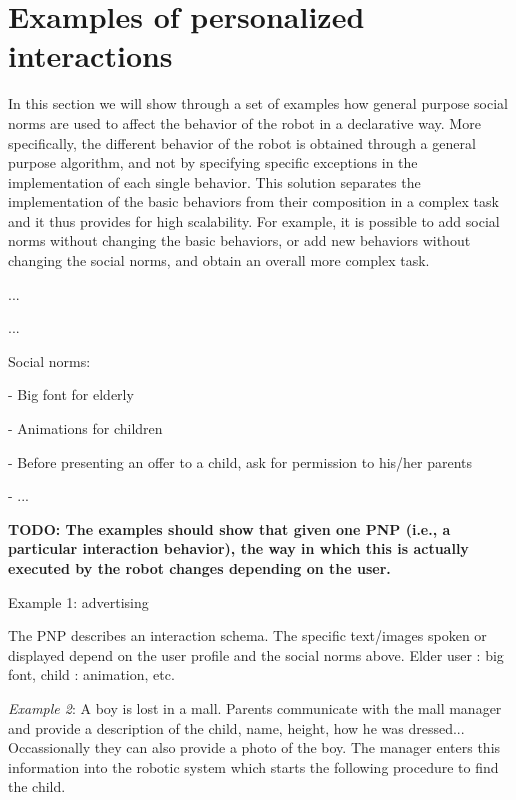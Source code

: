 \section{Examples of personalized interactions}


In this section we will show through a set of examples how general purpose social norms are used to affect the behavior of the robot in a declarative way. More specifically, the different behavior of the robot is obtained through a general purpose algorithm, and not by specifying specific exceptions in the implementation of each single behavior.
This solution separates the implementation of the basic behaviors from their composition in a complex task and it thus provides for high scalability. For example, it is possible to add social norms without changing the basic behaviors, or add new behaviors without changing the social norms, and obtain an overall more complex task.


...





...

Social norms:

- Big font for elderly

- Animations for children 

- Before presenting an offer to a child, ask for permission to his/her parents

- ...



{\bf TODO: The examples should show that given one PNP (i.e., a particular interaction behavior), the way in which this is actually executed by the robot changes depending on the user.}


Example 1: advertising

The PNP describes an interaction schema. The specific text/images spoken or displayed depend on the user profile and the social norms above.
Elder user : big font, child : animation, etc.












\textit{Example 2}: 
A boy is lost in a mall. Parents communicate with the mall manager and provide a description of the child, name, height, how he was dressed... Occassionally they can also provide a photo of the boy. The manager enters this information into the robotic system which starts the following procedure to find the child.

